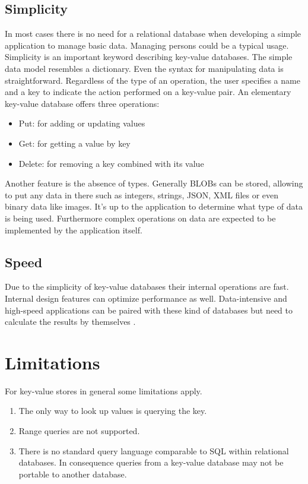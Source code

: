 \subsection{Simplicity}
In most cases there is no need for a relational database when developing a
simple application to manage basic data. Managing persons could be a typical
usage. Simplicity is an important keyword describing key-value databases. The
simple data model resembles a dictionary. Even the syntax for manipulating data
is straightforward. Regardless of the type of an operation, the user specifies a
name and a key to indicate the action performed on a key-value pair. An
elementary key-value database offers three operations:
\begin{itemize}
    \item Put: for adding or updating values
    \item Get: for getting a value by key
    \item Delete: for removing a key combined with its value
\end{itemize}
Another feature is the absence of types. Generally BLOBs can be stored, allowing
to put any data in there such as integers, strings, JSON, XML files or even
binary data like images. It’s up to the application to determine what type of
data is being used. Furthermore complex operations on data are expected to be
implemented by the application itself.

\subsection{Speed}
Due to the simplicity of key-value databases their internal operations are fast.
Internal design features can optimize performance as well. Data-intensive and
high-speed applications can be paired with these kind of databases but need to
calculate the results by themselves \cite{fulmanskikeyvalue}.
\newpage
\section{Limitations}
For key-value stores in general some limitations apply.
\begin{enumerate}
    \item The only way to look up values is querying the key.
    \item Range queries are not supported.
    \item There is no standard query language comparable to SQL within
    relational databases. In consequence queries from a key-value database may
    not be portable to another database.
\end{enumerate}
\cite{fulmanskikeyvalue}

